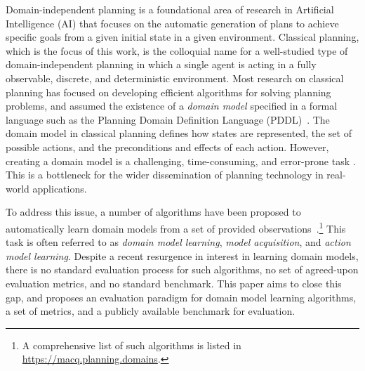 \documentclass{article}
\theoremstyle{definition}
\theoremstyle{remark}
\newif\ifaddcomments
\newcommand{\roni}[1]{\ifaddcomments{\textcolor{red}{[Roni: #1]}}\fi}
\newcommand{\yarin}[1]{\ifaddcomments{\textcolor{teal}{[Yarin: #1]}}\fi}
\newcommand{\cm}[1]{\ifaddcomments{\textcolor{olive}{[Christian: #1]}}\fi}
\begin{document}
Domain-independent planning is a foundational area of research in Artificial Intelligence (AI) that focuses on the automatic generation of plans to achieve specific goals from a given initial state in a given environment. Classical planning, which is the focus of this work, is the colloquial name for a well-studied type of domain-independent planning in which a single agent is acting in a fully observable, discrete, and deterministic environment. 
Most research on classical planning has focused on developing efficient algorithms for solving planning problems, and assumed the existence of a \emph{domain model} specified in a formal language such as the Planning Domain Definition Language (PDDL)~\citep{haslum2019introduction}. 
The domain model in classical planning defines how states are represented, the set of possible actions, and the preconditions and effects of each action. 
However, creating a domain model is a challenging, time-consuming, and error-prone task \citep{DBLP:conf/kcap/McCluskeyVV17}.
This is a bottleneck for the wider dissemination of planning technology in real-world applications. 

To address this issue, a number of algorithms have been proposed to automatically learn domain models from a set of provided observations~\citep{macq,aineto2019learning,jimenez2012review}.\footnote{A comprehensive list of such algorithms is listed in \url{https://macq.planning.domains}.} 
This task is often referred to as \emph{domain model learning}, \emph{model acquisition}, and \emph{action model learning}. 
Despite a recent resurgence in interest in learning domain models, there is no standard evaluation process for such algorithms, no set of agreed-upon evaluation metrics, and no standard benchmark. 
This paper aims to close this gap, and proposes an evaluation paradigm for domain model learning algorithms, a set of metrics, and a publicly available benchmark for evaluation. 
\end{document}
